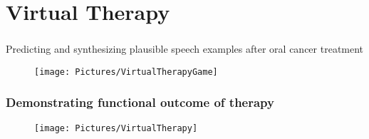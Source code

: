\documentclass[xcolor=dvipsnames]{beamer}
\begin{document}
\section{Virtual Therapy}

\begin{frame}
	\frametitle{\insertsection}
	\begin{center}
	{\large Predicting and synthesizing plausible speech examples after oral cancer treatment}
	\begin{figure}[l]
     \texttt{[image: Pictures/VirtualTherapyGame]}
	\end{figure}
	\end{center}
\end{frame}

\begin{frame}
	\frametitle{Demonstrating functional outcome of therapy}
		
	\begin{center}
	\begin{figure}[l]
     \texttt{[image: Pictures/VirtualTherapy]}
	\end{figure}
	\end{center}
\end{frame}
\end{document}
